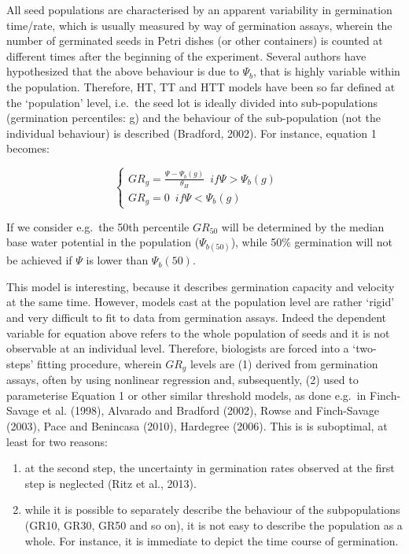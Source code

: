 \documentclass[a4paper,12pt]{article}
\providecommand{\tightlist}{%
	\setlength{\itemsep}{0pt}\setlength{\parskip}{0pt}}
\begin{document}
All seed populations are characterised by an apparent variability in
germination time/rate, which is usually measured by way of germination
assays, wherein the number of germinated seeds in Petri dishes (or other
containers) is counted at different times after the beginning of the
experiment. Several authors have hypothesized that the above behaviour
is due to \(\Psi_b\), that is highly variable within the population.
Therefore, HT, TT and HTT models have been so far defined at the
`population' level, i.e.~the seed lot is ideally divided into
sub-populations (germination percentiles: g) and the behaviour of the
sub-population (not the individual behaviour) is described (Bradford,
2002). For instance, equation 1 becomes:

\[\left\{ {\begin{array}{*{20}{l}}
    GR_g = \frac{\Psi - \Psi_b(g)}{\theta_H} \,\,\, if \Psi > \Psi_b(g)\\
    GR_g = 0 \,\,\, if \Psi < \Psi_b(g)
\end{array}} \right. \,\,\,\,\,\,\,\,\]

If we consider e.g.~the 50th percentile \(GR_50\) will be determined by
the median base water potential in the population (\(\Psi_{b(50)}\)),
while 50\% germination will not be achieved if \(\Psi\) is lower than
\(\Psi_b(50)\).

This model is interesting, because it describes germination capacity and
velocity at the same time. However, models cast at the population level
are rather `rigid' and very difficult to fit to data from germination
assays. Indeed the dependent variable for equation above refers to the
whole population of seeds and it is not observable at an individual
level. Therefore, biologists are forced into a `two-steps' fitting
procedure, wherein \(GR_g\) levels are (1) derived from germination
assays, often by using nonlinear regression and, subsequently, (2) used
to parameterise Equation 1 or other similar threshold models, as done
e.g.~in Finch-Savage et al. (1998), Alvarado and Bradford (2002), Rowse
and Finch-Savage (2003), Pace and Benincasa (2010), Hardegree (2006).
This is is suboptimal, at least for two reasons:

\begin{enumerate}
\def\labelenumi{\arabic{enumi}.}
\tightlist
\item
  at the second step, the uncertainty in germination rates observed at
  the first step is neglected (Ritz et al., 2013).
\item
  while it is possible to separately describe the behaviour of the
  subpopulations (GR10, GR30, GR50 and so on), it is not easy to
  describe the population as a whole. For instance, it is immediate to
  depict the time course of germination.
\end{enumerate}
\end{document}
